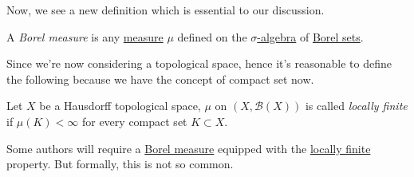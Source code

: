 Now, we see a new definition which is essential to our discussion.
\begin{definition}\label{def:Borel-measure}
	A \emph{Borel measure} is any \hyperref[def:measure]{measure} \(\mu\) defined on the \hyperref[def:sigma-algebra]{\(\sigma\)-algebra} of \hyperref[def:Borel-set]{Borel sets}.
\end{definition}

Since we're now considering a topological space, hence it's reasonable to define the following because we have the concept of compact set now.

\begin{definition}\label{def:locally-finite}
	Let \(X\) be a Hausdorff topological space, \(\mu\) on \((X, \mathcal{B} (X))\) is called \emph{locally finite} if \(\mu (K)<\infty \)
	for every compact set \(K\subset X\).
\end{definition}

\begin{note}
	Some authors will require a \hyperref[def:Borel-measure]{Borel measure} equipped with the \hyperref[def:locally-finite]{locally finite} property.
	But formally, this is not so common.
\end{note}

